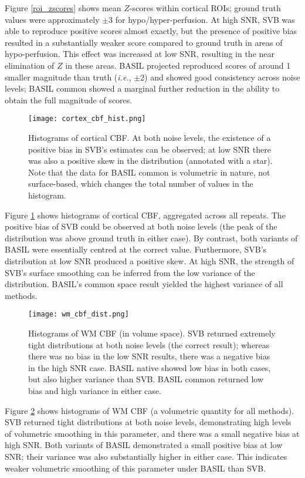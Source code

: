 Figure \ref{roi_zscores} shows mean $Z$-scores within cortical ROIs; ground truth values were approximately $\pm$3 for hypo/hyper-perfusion. At high SNR, SVB was able to reproduce positive scores almost exactly, but the presence of positive bias resulted in a substantially weaker score compared to ground truth in areas of hypo-perfusion. This effect was increased at low SNR, resulting in the near elimination of $Z$ in these areas. BASIL projected reproduced scores of around 1 smaller magnitude than truth (\textit{i.e.}, $\pm$2) and showed good consistency across noise levels; BASIL common showed a marginal further reduction in the ability to obtain the full magnitude of scores. 

\begin{figure}[H]
\centering
\texttt{[image: cortex\_cbf\_hist.png]}
\caption{Histograms of cortical CBF. At both noise levels, the existence of a positive bias in SVB's estimates can be observed; at low SNR there was also a positive skew in the distribution (annotated with a star). Note that the data for BASIL common is volumetric in nature, not surface-based, which changes the total number of values in the histogram.}
\label{cortex_cbf_hist} 
\end{figure}

Figure \ref{cortex_cbf_hist} shows histograms of cortical CBF, aggregated across all repeats. The positive bias of SVB could be observed at both noise levels (the peak of the distribution was above ground truth in either case). By contrast, both variants of BASIL were essentially centred at the correct value. Furthermore, SVB's distribution at low SNR produced a positive skew. At high SNR, the strength of SVB's surface smoothing can be inferred from the low variance of the distribution. BASIL's common space result yielded the highest variance of all methods. 

\begin{figure}[H]
\centering
\texttt{[image: wm\_cbf\_dist.png]}
\caption{Histograms of WM CBF (in volume space). SVB returned extremely tight distributions at both noise levels (the correct result); whereas there was no bias in the low SNR results, there was a negative bias in the high SNR case. BASIL native showed low bias in both cases, but also higher variance than SVB. BASIL common returned low bias and high variance in either case.}
\label{wm_cbf_dist} 
\end{figure}

Figure \ref{wm_cbf_dist} shows histograms of WM CBF (a volumetric quantity for all methods). SVB returned tight distributions at both noise levels, demonstrating high levels of volumetric smoothing in this parameter, and there was a small negative bias at high SNR. Both variants of BASIL demonstrated a small positive bias at low SNR; their variance was also substantially higher in either case. This indicates weaker volumetric smoothing of this parameter under BASIL than SVB. 

